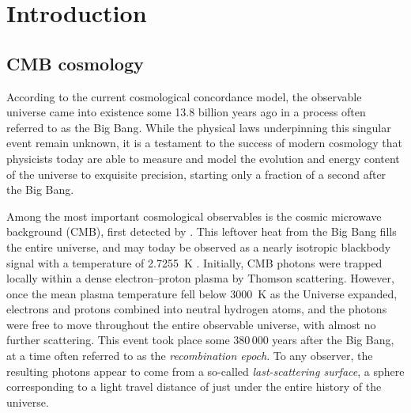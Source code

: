 \documentclass[onecolumn]{aa}
\begin{document}

\maketitle

\tableofcontents


\section{Introduction}
\label{sec:introduction}

\subsection{CMB cosmology}

According to the current cosmological concordance model, the
observable universe came into existence some 13.8 billion years ago in
a process often referred to as the Big Bang. While the physical laws
underpinning this singular event remain unknown, it is a testament to
the success of modern cosmology that physicists today are able to
measure and model the evolution and energy content of the universe to
exquisite precision, starting only a fraction of a second after the
Big Bang.

Among the most important cosmological observables is the cosmic
microwave background (CMB), first detected by \citet{penzias:1965}.
This leftover heat from the Big Bang fills the entire
universe, and may today be observed as a nearly isotropic
blackbody signal with a temperature of 2.7255~K
\citep{fixsen2009}. Initially, CMB photons were
trapped locally within a dense electron--proton plasma by Thomson
scattering. However, once the mean plasma temperature fell below
3000~K as the Universe expanded, electrons and protons combined into neutral hydrogen atoms,
and the photons were free to move throughout the entire observable
universe, with almost no further scattering. This event took place some
380\,000 years after the Big Bang, at a time often referred to as the
\emph{recombination epoch}. To any observer, the
resulting photons appear to come from a so-called
\emph{last-scattering surface}, a sphere corresponding to a light 
travel distance of just under the entire history of the universe.
\end{document}
